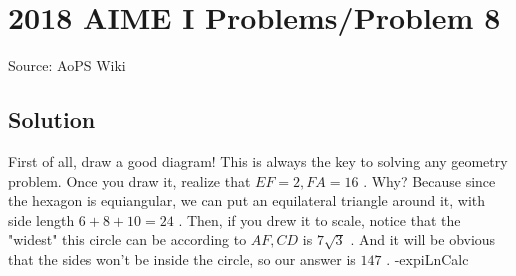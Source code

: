 \documentclass[12pt]{article}
\begin{document}
\section*{{2018 AIME I Problems/Problem 8}}
Source: AoPS Wiki

\subsection*{Solution}
First of all, draw a good diagram! This is always the key to solving any geometry problem. Once you draw it, realize that $EF=2, FA=16$ . Why? Because since the hexagon is equiangular, we can put an equilateral triangle around it, with side length $6+8+10=24$ . Then, if you drew it to scale, notice that the "widest" this circle can be according to $AF, CD$ is $7\sqrt{3}$ . And it will be obvious that the sides won't be inside the circle, so our answer is $\boxed{147}$ . -expiLnCalc
\end{document}
